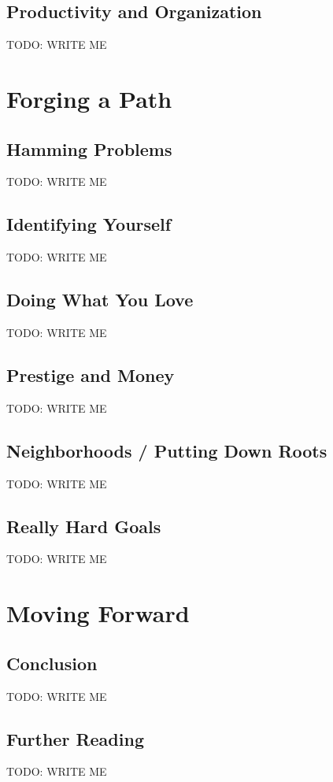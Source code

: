 \documentclass[]{book}
\newcommand{\TOWRITE}{TODO: WRITE ME}
\begin{document}
\chapter{Productivity and Organization}
\TOWRITE


\part{Forging a Path}

\chapter{Hamming Problems}
\TOWRITE

\chapter{Identifying Yourself}
\TOWRITE

\chapter{Doing What You Love}
\TOWRITE

\chapter{Prestige and Money}
\TOWRITE



\chapter{Neighborhoods / Putting Down Roots}
\TOWRITE

\chapter{Really Hard Goals}
\TOWRITE


\part{Moving Forward}

\chapter{Conclusion}
\TOWRITE

\chapter{Further Reading}
\TOWRITE
\end{document}
